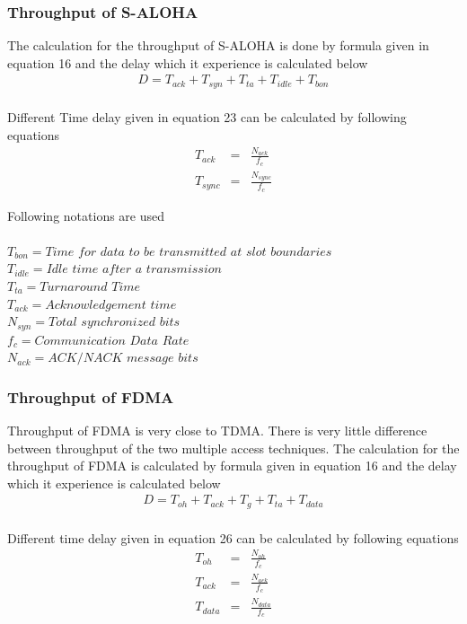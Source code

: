 \documentclass[11pt, conference, compsocconf, onecolumn]{IEEEtran}
\begin{document}
\subsubsection{Throughput of S-ALOHA}
The calculation for the throughput of S-ALOHA is done by formula given in equation 16 and the delay which it experience is calculated below
\begin{eqnarray}
D=T_{ack}+T_{syn}+T_{ta}+T_{idle}+ T_{bon}
\end{eqnarray}
\\
Different Time delay given in equation 23 can be calculated by following equations
\begin{eqnarray}
T_{ack}&=&\frac{N_{ack}}{f_{c}}
\\
T_{sync}&=&\frac{N_{sync}}{f_{c}}
\end{eqnarray}

Following notations are used
\\\\
$T_{bon}=Time$ $for$ $data$ $to$ $be$ $transmitted$ $at$ $slot$ $boundaries$
\\
$T_{idle}=Idle$ $time$ $after$ $a$ $transmission$
\\
$T_{ta}=Turnaround$ $Time$
\\
$T_{ack}=Acknowledgement$ $time$
\\
$N_{syn}=Total$ $synchronized$ $bits$
\\
$f_{c}= Communication$ $Data$ $Rate$
\\
$N_{ack}=ACK/NACK$ $message$ $bits$
\\
\subsubsection{Throughput of FDMA}
Throughput of FDMA is very close to TDMA. There is very little difference between throughput of the two multiple access techniques. The calculation for the throughput of FDMA is calculated by formula given in equation 16 and the delay which it experience is calculated below
\begin{eqnarray}
D=T_{oh}+T_{ack}+T_{g}+T_{ta}+T_{data}
\end{eqnarray}
\\
Different time delay given in equation 26 can be calculated by following equations
\\
\begin{eqnarray}
T_{oh}&=&\frac{N_{oh}}{f_{c}}
\\
T_{ack}&=&\frac{N_{ack}}{f_{c}}
\\
T_{data}&=&\frac{N_{data}}{f_{c}}
\end{eqnarray}
\end{document}
